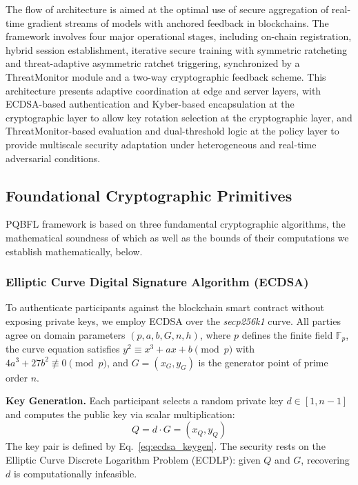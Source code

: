 \documentclass[journal, 10pt, twocolumn]{IEEEtran}
\begin{document}
The flow of architecture is aimed at the optimal use of secure aggregation of real-time gradient streams of models with anchored feedback in blockchains. The framework involves four major operational stages, including on-chain registration, hybrid session establishment, iterative secure training with symmetric ratcheting and threat-adaptive asymmetric ratchet triggering, synchronized by a ThreatMonitor module and a two-way cryptographic feedback scheme. This architecture presents adaptive coordination at edge and server layers, with ECDSA-based authentication and Kyber-based encapsulation at the cryptographic layer to allow key rotation selection at the cryptographic layer, and ThreatMonitor-based evaluation and dual-threshold logic at the policy layer to provide multiscale security adaptation under heterogeneous and real-time adversarial conditions.

\subsection{Foundational Cryptographic Primitives}
PQBFL framework is based on three fundamental cryptographic algorithms, the mathematical soundness of which as well as the bounds of their computations we establish mathematically, below.


\subsubsection{Elliptic Curve Digital Signature Algorithm (ECDSA)}
To authenticate participants against the blockchain smart contract without exposing private keys, we employ ECDSA over the \textit{secp256k1} curve. All parties agree on domain parameters $(p, a, b, G, n, h)$, where $p$ defines the finite field $\mathbb{F}_p$, the curve equation satisfies $y^2 \equiv x^3 + ax + b \pmod{p}$ with $4a^3 + 27b^2 \not\equiv 0 \pmod{p}$, and $G = (x_G, y_G)$ is the generator point of prime order $n$.

\textbf{Key Generation.} Each participant selects a random private key $d \in [1, n-1]$ and computes the public key via scalar multiplication:
\begin{equation}
Q = d \cdot G = (x_Q, y_Q)
\label{eq:ecdsa_keygen}
\end{equation}
The key pair is defined by Eq.~\eqref{eq:ecdsa_keygen}. The security rests on the Elliptic Curve Discrete Logarithm Problem (ECDLP): given $Q$ and $G$, recovering $d$ is computationally infeasible.
\end{document}
